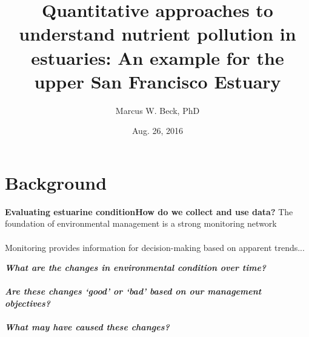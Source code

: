 \documentclass[serif]{beamer}\usepackage[]{graphicx}\usepackage[]{color}
\newcommand{\emtxt}[1]{\textbf{\textit{#1}}}
\begin{document}
\title[Evaluating water quality]{\textbf{Quantitative approaches to understand nutrient pollution in estuaries: An example for the upper San Francisco Estuary}}
\author[M. Beck]{Marcus W. Beck, PhD}


\date{Aug. 26, 2016}


\begin{frame}[shrink]
\titlepage
\end{frame}

\section{Background}

\begin{frame}{\textbf{Evaluating estuarine condition}}{\textbf{How do we collect and use data?}}
\onslide<+->
The foundation of environmental management is a strong monitoring network \scriptsize \cite{NRC90}\\~\\
\normalsize
Monitoring provides information for decision-making based on apparent trends...
\vspace{0.2in}
\begin{center}
\emtxt{What are the changes in environmental condition over time?}\\~\\
\emtxt{Are these changes `good' or `bad' based on our management objectives?}\\~\\
\emtxt{What may have caused these changes?}
\end{center}
\end{frame}
\end{document}

